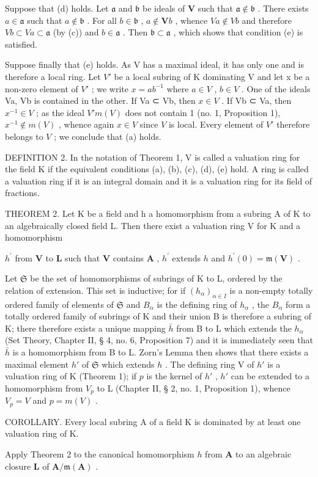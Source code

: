 Suppose that (d) holds. Let \(\mathfrak{a}\) and \(\mathfrak{b}\) be ideals of \(\mathbf{V}\) such that \(\mathfrak{a} \notin \mathfrak{b}\) . There exists \(a \in \mathfrak{a}\) such that \(a \notin \mathfrak{b}\) . For all \(b \in \mathfrak{b}\) , \(a \notin \mathbf{V}b\) , whence \(Va \notin Vb\) and therefore \(Vb \subset Va \subset \mathfrak{a}\) (by (c)) and \(b \in \mathfrak{a}\) . Then \(\mathfrak{b} \subset \mathfrak{a}\) , which shows that condition (e) is satisfied.

Suppose finally that (e) holds. As V has a maximal ideal, it has only one and is therefore a local ring. Let \(V'\) be a local subring of K dominating V and let x be a non-zero element of \(V'\) ; we write \(x = ab^{-1}\) where \(a \in V\) , \(b \in V\) . One of the ideals Va, Vb is contained in the other. If Va ⊂ Vb, then \(x \in V\) . If Vb ⊂ Va, then \(x^{-1} \in V\) ; as the ideal \(V'm(V)\) does not contain 1 (no. 1, Proposition 1), \(x^{-1} \notin m(V)\) , whence again \(x \in V\) since \(V\) is local. Every element of \(V'\) therefore belongs to \(V\) ; we conclude that (a) holds.

DEFINITION 2. In the notation of Theorem 1, V is called a valuation ring for the field K if the equivalent conditions (a), (b), (c), (d), (e) hold. A ring is called a valuation ring if it is an integral domain and it is a valuation ring for its field of fractions.

THEOREM 2. Let K be a field and h a homomorphism from a subring A of K to an algebraically closed field L. Then there exist a valuation ring V for K and a homomorphism

\(h^{\prime}\) from \(\mathbf{V}\) to \(\mathbf{L}\) such that \(\mathbf{V}\) contains \(\mathbf{A}\) , \(h^{\prime}\) extends \(h\) and \(h^{\prime}(0) = \mathfrak{m}(\mathbf{V})\) .

Let \(\mathfrak{S}\) be the set of homomorphisms of subrings of K to L, ordered by the relation of extension. This set is inductive; for if \((h_{\alpha})_{\alpha \in I}\) is a non-empty totally ordered family of elements of \(\mathfrak{S}\) and \(B_{\alpha}\) is the defining ring of \(h_{\alpha}\) , the \(B_{\alpha}\) form a totally ordered family of subrings of K and their union B is therefore a subring of K; there therefore exists a unique mapping \(\bar{h}\) from B to L which extends the \(h_{\alpha}\) (Set Theory, Chapter II, § 4, no. 6, Proposition 7) and it is immediately seen that \(\bar{h}\) is a homomorphism from B to L. Zorn's Lemma then shows that there exists a maximal element \(h'\) of \(\mathfrak{S}\) which extends \(h\) . The defining ring V of \(h'\) is a valuation ring of K (Theorem 1); if \(p\) is the kernel of \(h'\) , \(h'\) can be extended to a homomorphism from \(V_p\) to L (Chapter II, § 2, no. 1, Proposition 1), whence \(V_p = V\) and \(p = m(V)\) .

COROLLARY. Every local subring A of a field K is dominated by at least one valuation ring of K.

Apply Theorem 2 to the canonical homomorphism \(h\) from \(\mathbf{A}\) to an algebraic closure \(\mathbf{L}\) of \(\mathbf{A} / \mathfrak{m}(\mathbf{A})\) .

